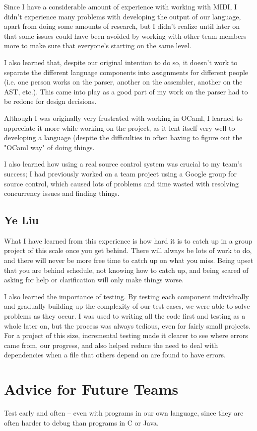 \documentclass[12pt,A4]{book}
\begin{document}
Since I have a considerable amount of experience with working with MIDI, I didn’t experience many 
problems with developing the output of our language, apart from doing some amounts of research, but 
I didn’t realize until later on that some issues could have been avoided by working with other team 
members more to make sure that everyone’s starting on the same level.

I also learned that, despite our original intention to do so, it doesn’t work to separate the 
different language components into assignments for different people (i.e. one person works on the 
parser, another on the assembler, another on the AST, etc.). This came into play as a good part of 
my work on the parser had to be redone for design decisions.

Although I was originally very frustrated with working in OCaml, I learned to appreciate it more while working on the project, as it lent itself very well to developing a language (despite the difficulties in often having to figure out the "OCaml way" of doing things.

I also learned how using a real source control system was crucial to my team's success; I had previously worked on a team project using a Google group for source control, which caused lots of problems and time wasted with resolving concurrency issues and finding things.
\subsection{Ye Liu}
What I have learned from this experience is how hard it is to catch up in a group project of this scale once you get behind. There will always be lots of work to do, and there will never be more free time to catch up on what you miss. Being upset that you are behind schedule, not knowing how to catch up, and being scared of asking for help or clarification will only make things worse. 

I also learned the importance of testing. By testing each component individually and gradually building up the complexity of our test cases, we were able to solve problems as they occur. I was used to writing all the code first and testing as a whole later on, but the process was always tedious, even for fairly small projects. For a project of this size, incremental testing made it clearer to see where errors came from, our progress, and also helped reduce the need to deal with dependencies when a file that others depend on are found to have errors.

\section{Advice for Future Teams}
Test early and often – even with programs in our own language, since they are often harder to debug 
than programs in C or Java.
\end{document}
